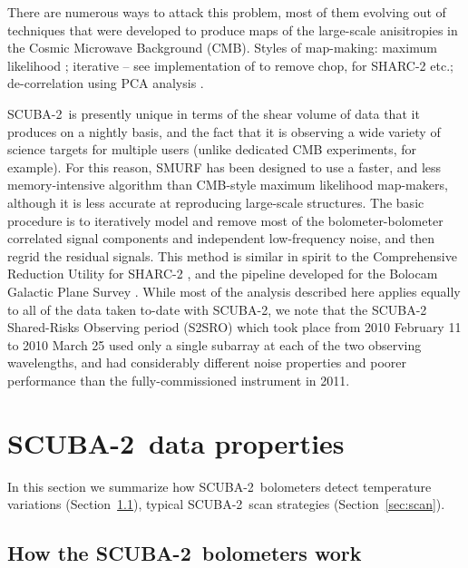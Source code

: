 \documentclass[useAMS,usenatbib,nofootinbib]{mn2e}
\newcommand{\scuba}{SCUBA-2}
\begin{document}
There are numerous ways to attack this problem, most of them evolving
out of techniques that were developed to produce maps of the
large-scale anisitropies in the Cosmic Microwave Background (CMB).  Styles
of map-making: maximum likelihood \citep[e.g.,][]{patanchon2008};
iterative -- see \citet{johnstone2000} implementation of
\citet{wright1996} to remove chop, \citet{kovacs2008} for SHARC-2
etc.; de-correlation using PCA analysis
\citep[e.g.][]{laurent2005,scott2008,aguirre2010}.

\scuba\ is presently unique in terms of the shear volume of data that
it produces on a nightly basis, and the fact that it is observing a
wide variety of science targets for multiple users (unlike dedicated
CMB experiments, for example). For this reason, SMURF has been
designed to use a faster, and less memory-intensive algorithm than
CMB-style maximum likelihood map-makers, although it is less accurate
at reproducing large-scale structures. The basic procedure is to
iteratively model and remove most of the bolometer-bolometer
correlated signal components and independent low-frequency noise, and
then regrid the residual signals. This method is similar in spirit to
the Comprehensive Reduction Utility for SHARC-2
\citep[CRUSH,][]{kovacs2008}, and the pipeline developed for the
Bolocam Galactic Plane Survey \citep{aguirre2010}. While most of the
analysis described here applies equally to all of the data taken
to-date with \scuba, we note that the SCUBA-2 Shared-Risks Observing
period (S2SRO) which took place from 2010 February 11 to 2010 March 25
used only a single subarray at each of the two observing wavelengths,
and had considerably different noise properties and poorer performance
than the fully-commissioned instrument in 2011.

\section{\scuba\ data properties}
\label{sec:data}

In this section we summarize how \scuba\ bolometers detect temperature
variations (Section~\ref{sec:bolos}), typical \scuba\ scan strategies
(Section~\ref{sec:scan}).

\subsection{How the \scuba\ bolometers work}
\label{sec:bolos}
\end{document}
